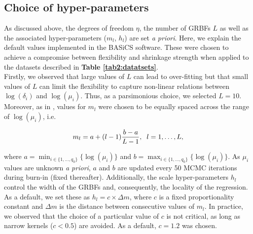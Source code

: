 \newpage

\subsection{Choice of hyper-parameters} \label{sec2:hyper-parameters}

As discussed above, the degrees of freedom $\eta$, the number of GRBFs  $L$ as well as the associated hyper-parameters ($m_l$, $h_l$) are set \emph{a priori}. Here, we explain the default values implemented in the BASiCS software. These were chosen to achieve a compromise between flexibility and shrinkage strength when applied to the datasets described in \textbf{Table \ref{tab2:datatsets}}. \\ 

Firstly, we observed that large values of $L$ can lead to over-fitting but that small values of $L$ can limit the flexibility to capture non-linear relations between $\log(\delta_i)$ and $\log(\mu_i)$. Thus, as a parsimonious choice, we selected $L = 10$. Moreover, as in \cite{Kapourani2016}, values for $m_l$ were chosen to be equally spaced across the range of $\log(\mu_i)$, i.e. 

\begin{equation} m_l = a + (l-1)\frac{b - a }{L-1}, \hspace{0.2cm}  l=1,\ldots, L, \end{equation} 

where $a=\min_{i\in\{1,\ldots,q_0\}}\{\log(\mu_i)\}$ and $b=\max_{i\in\{1,\ldots,q_0\}}\{\log(\mu_i)\}$. As $\mu_i$ values are unknown \emph{a priori}, $a$ and $b$ are updated every 50 MCMC iterations during burn-in (fixed thereafter). Additionally, the scale hyper-parameters $h_l$ control the width of the GRBFs and, consequently, the locality of the regression. As a default, we set these as $h_l = c \times \Delta m$, where $c$ is a fixed proportionality constant and $\Delta m$ is the distance between consecutive values of $m_l$. In practice, we observed that the choice of a particular value of $c$ is not critical, as long as narrow kernels ($c<0.5$) are avoided. As a default, $c = 1.2$ was chosen. \\

